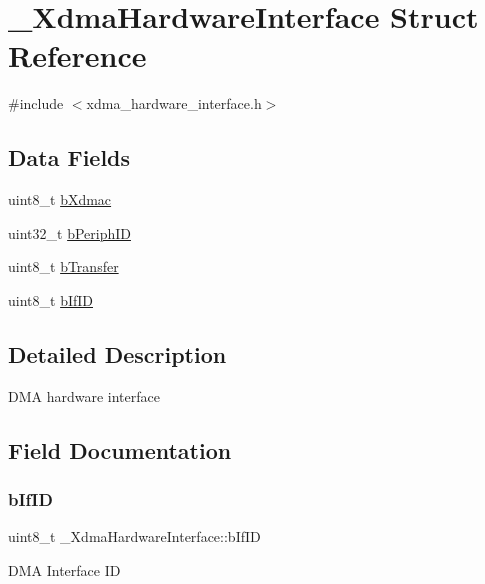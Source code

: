 \hypertarget{struct__XdmaHardwareInterface}{}\section{\+\_\+\+Xdma\+Hardware\+Interface Struct Reference}
\label{struct__XdmaHardwareInterface}


{\ttfamily \#include $<$xdma\+\_\+hardware\+\_\+interface.\+h$>$}

\subsection*{Data Fields}
\begin{DoxyCompactItemize}
\item 
uint8\+\_\+t \mbox{\hyperlink{struct__XdmaHardwareInterface_a0ec1de1fb532fa4c1f1072735201ae7f}{b\+Xdmac}}
\item 
uint32\+\_\+t \mbox{\hyperlink{struct__XdmaHardwareInterface_a5d6010ddabfbff93ebf53c85087a0180}{b\+Periph\+ID}}
\item 
uint8\+\_\+t \mbox{\hyperlink{struct__XdmaHardwareInterface_a42f348c18682e5bc07006652d08144bb}{b\+Transfer}}
\item 
uint8\+\_\+t \mbox{\hyperlink{struct__XdmaHardwareInterface_a96eb41cfa7505c4eb1f1ff63d98a6811}{b\+If\+ID}}
\end{DoxyCompactItemize}


\subsection{Detailed Description}
D\+MA hardware interface 

\subsection{Field Documentation}
\mbox{\label{struct__XdmaHardwareInterface_a96eb41cfa7505c4eb1f1ff63d98a6811}} 
\subsubsection{\texorpdfstring{bIfID}{bIfID}}
{\footnotesize\ttfamily uint8\+\_\+t \+\_\+\+Xdma\+Hardware\+Interface\+::b\+If\+ID}

D\+MA Interface ID \mbox{\label{struct__XdmaHardwareInterface_a5d6010ddabfbff93ebf53c85087a0180}} 
